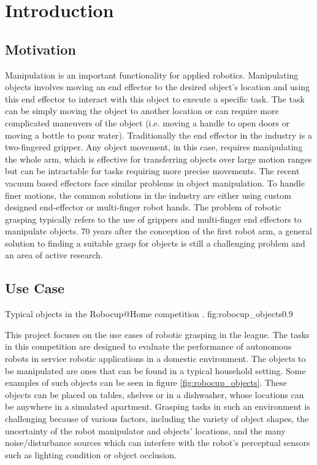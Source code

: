 
\chapter{Introduction}


\section{Motivation}

Manipulation is an important functionality for applied robotics. Manipulating objects involves moving an end effector
to the desired object's location and using this end effector to interact with this object to execute a specific task.
The task can be simply moving the object to another location or can require more complicated maneuvers of the object
(i.e. moving a handle to open doors or moving a bottle to pour water). Traditionally the end effector in the industry
is a two-fingered gripper. Any object movement, in this case, requires manipulating the whole arm, which is effective
for transferring objects over large motion ranges but can be intractable for tasks requiring more precise movements.
The recent vacuum based effectors face similar problems in object manipulation. To handle finer motions, the common
solutions in the industry are either using custom designed end-effector or multi-finger robot hands. The problem of
robotic grasping typically refers to the use of grippers and multi-finger end effectors to manipulate objects. 70 years
after the conception of the first robot arm, a general solution to finding a suitable grasp for objects is still a
challenging problem and an area of active research.


\section{Use Case}

             {Typical objects in the Robocup@Home competition \cite{robocupRulebook2018}.}
             {fig:robocup_objects}{0.9\textwidth}

This project focuses on the use cases of robotic grasping in the
 league. The tasks in this competition are designed to
evaluate the performance of autonomous robots in service robotic applications in a domestic environment. The objects to
be manipulated are ones that can be found in a typical household setting. Some examples of such objects can be seen in
figure \ref{fig:robocup_objects}. These objects can be placed on tables, shelves or in a dishwasher, whose locations
can be anywhere in a simulated apartment. Grasping tasks in such an environment is challenging because of various
factors, including the variety of object shapes, the uncertainty of the robot manipulator and objects' locations,
and the many noise/disturbance sources which can interfere with the robot's perceptual sensors such as lighting
condition or object occlusion.

